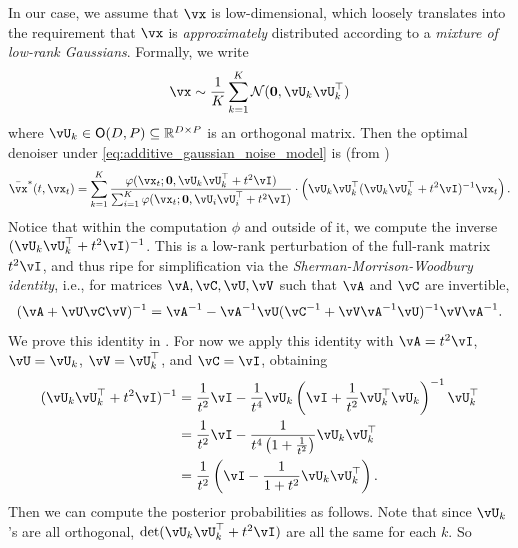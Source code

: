 \documentclass[../../book-main.tex]{subfiles}
\begin{document}
In our case, we assume that \(\vx\) is low-dimensional, which loosely translates into the requirement that \(\vx\) is \textit{approximately} distributed according to a \textit{mixture of low-rank Gaussians}. Formally, we write 
\begin{equation}\label{eq:MoG1}
	\vx \sim \frac{1}{K}\sum_{k = 1}^{K}\dNorm(\vzero, \vU_{k}\vU_{k}^{\top})
\end{equation}
where \(\vU_{k} \in \O(D, P) \subseteq \R^{D \times P}\) is an orthogonal matrix. Then the optimal denoiser under \eqref{eq:additive_gaussian_noise_model} is (from )
\begin{equation}
	\bar{\vx}^{\ast}(t, \vx_{t}) = \sum_{k = 1}^{K}\frac{\phi(\vx_{t} ; \vzero,
	\vU_{k}\vU_{k}^{\top} + t^{2}\vI)}{\sum_{i = 1}^{K}\phi(\vx_{t} ; \vzero, \vU_{i}\vU_{i}^{\top} + t^{2}\vI)}\cdot\bp{\vU_{k}\vU_{k}^{\top}(\vU_{k}\vU_{k}^{\top} + t^{2}\vI)^{-1}\vx_{t}}.
\end{equation}
Notice that within the computation \(\phi\) and outside of it, we compute the inverse \((\vU_{k}\vU_{k}^{\top} + t^{2}\vI)^{-1}\). This is a low-rank perturbation of the full-rank matrix \(t^{2}\vI\), and thus ripe for simplification via the \textit{Sherman-Morrison-Woodbury identity}, i.e., for matrices \(\vA, \vC, \vU, \vV\) such that \(\vA\) and \(\vC\) are invertible,
\begin{equation}\label{eq:sherman_morrison_woodbury}
	(\vA + \vU\vC\vV)^{-1} = \vA^{-1} - \vA^{-1}\vU(\vC^{-1} + \vV\vA^{-1}\vU)^{-1}\vV\vA^{-1}.
\end{equation}
We prove this identity in . For now we apply this identity with \(\vA = t^{2}\vI\), \(\vU = \vU_{k}\), \(\vV = \vU_{k}^{\top}\), and \(\vC = \vI\), obtaining
\begin{align}
	(\vU_{k}\vU_{k}^{\top} + t^{2}\vI)^{-1} 
	&= \frac{1}{t^{2}}\vI - \frac{1}{t^{4}}\vU_{k}\bp{\vI + \frac{1}{t^{2}}\vU_{k}^{\top}\vU_{k}}^{-1}\vU_{k}^{\top} \\
	&= \frac{1}{t^{2}}\vI - \frac{1}{t^{4}\bp{1 + \frac{1}{t^{2}}}}\vU_{k}\vU_{k}^{\top} \\
	&= \frac{1}{t^{2}}\bp{\vI - \frac{1}{1 + t^{2}}\vU_{k}\vU_{k}^{\top}}.
\end{align}
Then we can compute the posterior probabilities as follows. Note that since \(\vU_{k}\)'s are all orthogonal, \(\det(\vU_{k}\vU_{k}^{\top} + t^{2}\vI)\) are all the same for each \(k\). So
\end{document}
